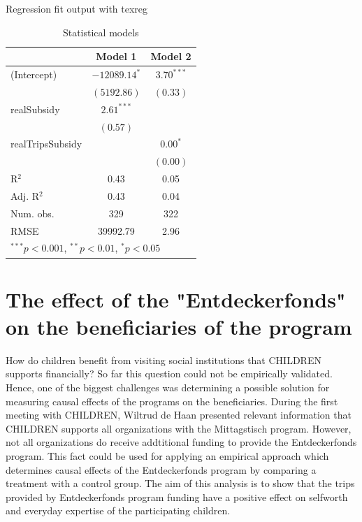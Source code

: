 \documentclass[12pt, a4paper]{article}\usepackage[]{graphicx}\usepackage[]{color}
\begin{document}
Regression fit output with texreg\\


\begin{table}
\begin{center}
\begin{tabular}{l c c }
\hline
 & Model 1 & Model 2 \\
\hline
(Intercept)      & $-12089.14^{*}$ & $3.70^{***}$ \\
                 & $(5192.86)$     & $(0.33)$     \\
realSubsidy      & $2.61^{***}$    &              \\
                 & $(0.57)$        &              \\
realTripsSubsidy &                 & $0.00^{*}$   \\
                 &                 & $(0.00)$     \\
\hline
R$^2$            & 0.43            & 0.05         \\
Adj. R$^2$       & 0.43            & 0.04         \\
Num. obs.        & 329             & 322          \\
RMSE             & 39992.79        & 2.96         \\
\hline
\multicolumn{3}{l}{\scriptsize{$^{***}p<0.001$, $^{**}p<0.01$, $^*p<0.05$}}
\end{tabular}
\caption{Statistical models}
\label{table:coefficients}
\end{center}
\end{table}



\section{The effect of the "Entdeckerfonds" on the beneficiaries of the program}

How do children benefit from visiting social institutions that CHILDREN supports financially? So far this question could not be empirically validated. Hence, one of the biggest challenges was determining a possible solution for measuring causal effects of the programs on the beneficiaries. During the first meeting with CHILDREN, Wiltrud de Haan presented relevant information that CHILDREN supports all organizations with the Mittagstisch program. However, not all organizations do receive addtitional funding to provide the Entdeckerfonds program. This fact could be used for applying an empirical approach which determines causal effects of the Entdeckerfonds program by comparing a treatment with a control group. The aim of this analysis is to show that the trips provided by Entdeckerfonds program funding have a positive effect on selfworth and everyday expertise of the participating children. 
\end{document}

